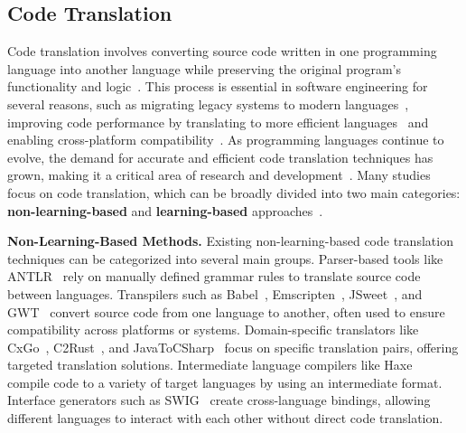\subsection{Code Translation}
Code translation involves converting source code written in one programming language into another language while preserving the original program's functionality and logic~\cite{pan2024lost,sun2024survey,eniser2024towards,dou2024s}. This process is essential in software engineering for several reasons, such as migrating legacy systems to modern languages~\cite{nguyen2013lexical,nguyen2014migrating}, improving code performance by translating to more efficient languages~\cite{aggarwal2015using} and enabling cross-platform compatibility~\cite{szafraniec2022code}. As programming languages continue to evolve, the demand for accurate and efficient code translation techniques has grown, making it a critical area of research and development~\cite{bahdanau2014neural, chen2018tree, artetxe2018unsupervised, devlin2018bert, feng2020codebert, guo2020graphcodebert, ahmad2021unified, guo2022unixcoder, zheng2023codegeex}. Many studies focus on code translation, which can be broadly divided into two main categories: 
\textbf{non-learning-based} and \textbf{learning-based} approaches~\cite{pan2024lost}. 

\textbf{Non-Learning-Based Methods.} Existing non-learning-based code translation techniques can be categorized into several main groups. Parser-based tools like ANTLR~\cite{ANTLR} rely on manually defined grammar rules to translate source code between languages. Transpilers such as Babel~\cite{Babel}, Emscripten~\cite{Emscripten}, JSweet~\cite{JSweet}, and GWT~\cite{GWT} convert source code from one language to another, often used to ensure compatibility across platforms or systems. Domain-specific translators like CxGo~\cite{CxGo}, C2Rust~\cite{c2rust}, and JavaToCSharp~\cite{javaTocsharp} focus on specific translation pairs, offering targeted translation solutions. Intermediate language compilers like Haxe~\cite{Haxe} compile code to a variety of target languages by using an intermediate format. Interface generators such as SWIG~\cite{SWIG} create cross-language bindings, allowing different languages to interact with each other without direct code translation. 


